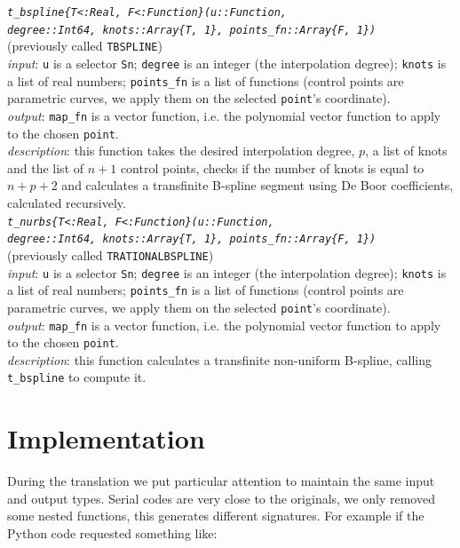 \documentclass[a4paper,11pt]{article}
\begin{document}
\emph{\texttt{t\_bspline\{T<:Real, F<:Function\}(u::Function, \\ degree::Int64, knots::Array\{T, 1\}, points\_fn::Array\{F, 1\})}} \\
(previously called \texttt{TBSPLINE}) \\
\emph{input}: \texttt{u} is a selector \texttt{Sn}; \texttt{degree} is an integer (the interpolation degree); \texttt{knots} is a list of real numbers; \texttt{points\_fn} is a list of functions (control points are parametric curves, we apply them on the selected \texttt{point}'s coordinate).\\
\emph{output}: \texttt{map\_fn} is a vector function, i.e. the polynomial vector function to apply to the chosen \texttt{point}. \\
\emph{description}: this function takes the desired interpolation degree, $p$, a list of knots and the list of $n + 1$ control points, checks if the number of knots is equal to $n+p+2$ and calculates a transfinite B-spline segment using De Boor coefficients, calculated recursively.  \\

\emph{\texttt{t\_nurbs\{T<:Real, F<:Function\}(u::Function, \\ degree::Int64, knots::Array\{T, 1\}, points\_fn::Array\{F, 1\})}} \\
(previously called \texttt{TRATIONALBSPLINE}) \\
\emph{input}: \texttt{u} is a selector \texttt{Sn}; \texttt{degree} is an integer (the interpolation degree); \texttt{knots} is a list of real numbers; \texttt{points\_fn} is a list of functions (control points are parametric curves, we apply them on the selected \texttt{point}'s coordinate).\\
\emph{output}: \texttt{map\_fn} is a vector function, i.e. the polynomial vector function to apply to the chosen \texttt{point}. \\
\emph{description}: this function calculates a transfinite non-uniform B-spline, calling \texttt{t\_bspline} to compute it.  \\


\section{Implementation}

During the translation we put particular attention to maintain the same input and output types. 
Serial codes are very close to the originals, we only removed some nested functions, this generates different signatures.
For example if the Python code requested something like:
\end{document}
